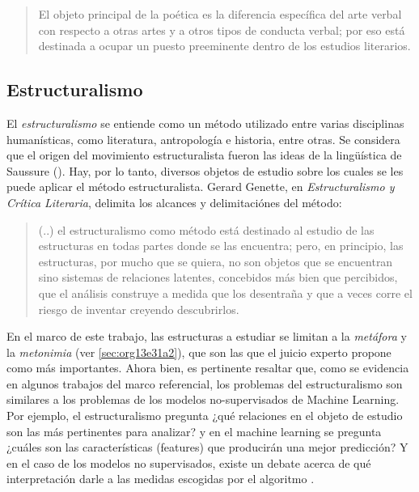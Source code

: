 \documentclass[12pt,letterpaper,twoside]{article}
\begin{document}
\begin{quote}
El objeto principal de la poética es la diferencia específica del
arte verbal con respecto a otras artes y a otros tipos de conducta
verbal; por eso está destinada a ocupar un puesto preeminente dentro
de los estudios literarios.\cite[pg. 121]{jakobson1981linguistica}
\end{quote}



\subsection{Estructuralismo}
\label{sec:orgb6e5421}

El \emph{estructuralismo} se entiende como un método utilizado entre
varias disciplinas humanísticas, como literatura, antropología e
historia, entre otras.  Se considera que el origen del movimiento
estructuralista fueron las ideas de la lingüística de Saussure
(). Hay, por lo tanto, diversos objetos de estudio
sobre los cuales se les puede aplicar el método estructuralista.
Gerard Genette, en \emph{Estructuralismo y Crítica Literaria}, delimita
los alcances y delimitaciónes del método:

\begin{quote}
 (..) el estructuralismo como método está destinado al estudio de las
estructuras en todas partes donde se las encuentra; pero, en
principio, las estructuras, por mucho que se quiera, no son objetos
que se encuentran sino sistemas de relaciones latentes, concebidos más
bien que percibidos, que el análisis construye a medida que los
desentraña y que a veces corre el riesgo de inventar creyendo
descubrirlos.  \cite[pg. 145]{genette1996estructuralismo}
\end{quote}

En el marco de este trabajo, las estructuras a estudiar se limitan
a la \emph{metáfora} y la \emph{metonimia} (ver \ref{sec:org13e31a2}), que son
las que el juicio experto propone como más importantes. Ahora
bien, es pertinente resaltar que, como se evidencia en algunos
trabajos del marco referencial, los problemas del estructuralismo
son similares a los problemas de los modelos no-supervisados de
Machine Learning. Por ejemplo, el estructuralismo pregunta ¿qué
relaciones en el objeto de estudio son las más pertinentes para
analizar? y en el machine learning se pregunta ¿cuáles son las
características (features) que producirán una mejor predicción? Y
en el caso de los modelos no supervisados, existe un debate acerca
de qué interpretación darle a las medidas escogidas por el
algoritmo \cite{van2019vector}.
\end{document}
